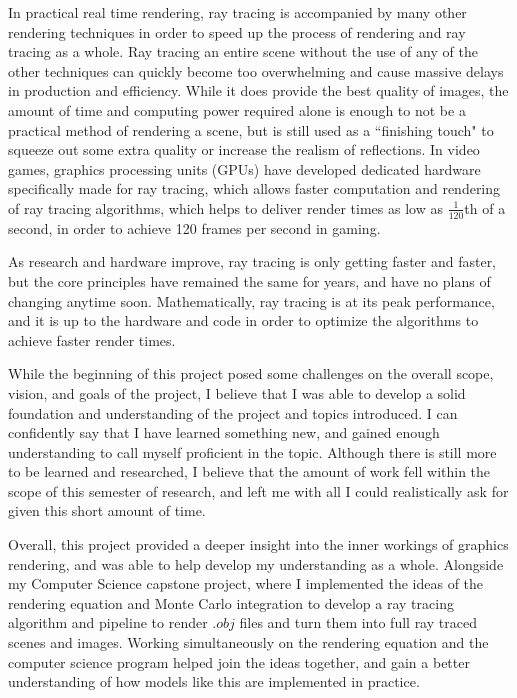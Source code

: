 \documentclass[12pt]{article}
\begin{document}
In practical real time rendering, ray tracing is accompanied by many other rendering techniques in order to speed up the process of rendering and ray tracing as a whole. Ray tracing an entire scene without the use of any of the other techniques can quickly become too overwhelming and cause massive delays in production and efficiency. While it does provide the best quality of images, the amount of time and computing power required alone is enough to not be a practical method of rendering a scene, but is still used as a ``finishing touch" to squeeze out some extra quality or increase the realism of reflections. In video games, graphics processing units (GPUs) have developed dedicated hardware specifically made for ray tracing, which allows faster computation and rendering of ray tracing algorithms, which helps to deliver render times as low as $\frac{1}{120}$th of a second, in order to achieve 120 frames per second in gaming. 

As research and hardware improve, ray tracing is only getting faster and faster, but the core principles have remained the same for years, and have no plans of changing anytime soon. Mathematically, ray tracing is at its peak performance, and it is up to the hardware and code in order to optimize the algorithms to achieve faster render times.

While the beginning of this project posed some challenges on the overall scope, vision, and goals of the project, I believe that I was able to develop a solid foundation and understanding of the project and topics introduced. I can confidently say that I have learned something new, and gained enough understanding to call myself proficient in the topic. Although there is still more to be learned and researched, I believe that the amount of work fell within the scope of this semester of research, and left me with all I could realistically ask for given this short amount of time. 

Overall, this project provided a deeper insight into the inner workings of graphics rendering, and was able to help develop my understanding as a whole. Alongside my Computer Science capstone project, where I implemented the ideas of the rendering equation and Monte Carlo integration to develop a ray tracing algorithm and pipeline to render $.obj$ files and turn them into full ray traced scenes and images. Working simultaneously on the rendering equation and the computer science program helped join the ideas together, and gain a better understanding of how models like this are implemented in practice.
\end{document}
